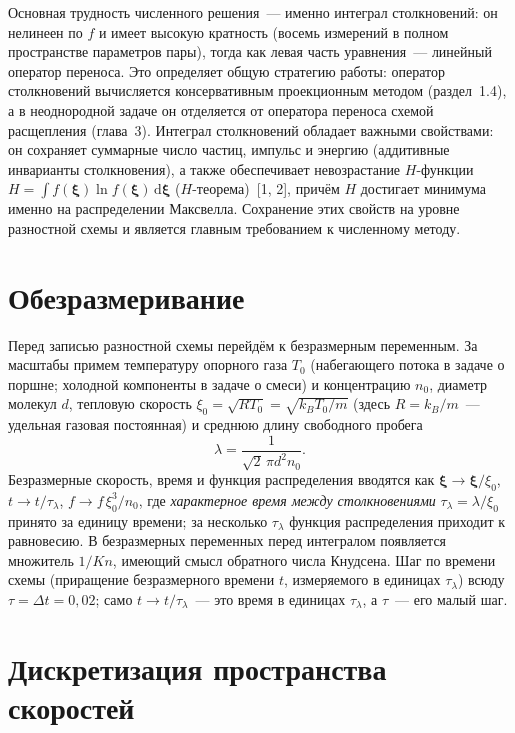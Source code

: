 \documentclass[14pt,a4paper]{extreport}
\numberwithin{equation}{chapter}
\numberwithin{figure}{chapter}
\numberwithin{table}{chapter}
\newcommand{\xv}{\boldsymbol{\xi}}
\newcommand{\dd}{\,\mathrm{d}}
\begin{document}
Основная трудность численного решения~--- именно интеграл столкновений: он нелинеен по $f$ и имеет высокую кратность
(восемь измерений в полном пространстве параметров пары), тогда как левая часть уравнения~--- линейный оператор
переноса.
Это определяет общую стратегию работы: оператор столкновений вычисляется консервативным проекционным методом
(раздел~1.4), а в неоднородной задаче он отделяется от оператора переноса схемой расщепления (глава~3).
Интеграл столкновений обладает важными свойствами: он сохраняет суммарные число частиц, импульс и энергию (аддитивные
инварианты столкновения), а также обеспечивает невозрастание $H$-функции $H = \int f(\xv) \ln f(\xv) \dd\xv$
($H$-теорема)~[1, 2], причём $H$ достигает минимума именно на распределении Максвелла.
Сохранение этих свойств на уровне разностной схемы и является главным требованием к численному методу.

\section{Обезразмеривание}

Перед записью разностной схемы перейдём к безразмерным переменным.
За масштабы примем температуру опорного газа $T_0$ (набегающего потока в задаче о поршне; холодной компоненты в задаче о
смеси) и концентрацию $n_0$, диаметр молекул $d$, тепловую скорость $\xi_0=\sqrt{RT_0}=\sqrt{k_B T_0/m}$ (здесь
$R=k_B/m$~--- удельная газовая постоянная) и среднюю длину свободного пробега
\begin{equation}
  \lambda=\frac{1}{\sqrt{2}\,\pi d^2 n_0}.
\end{equation}
Безразмерные скорость, время и функция распределения вводятся как $\xv\to\xv/\xi_0$, $t\to t/\tau_\lambda$, $f\to
f\,\xi_0^3/n_0$, где \emph{характерное время между столкновениями} $\tau_\lambda=\lambda/\xi_0$ принято за единицу
времени; за несколько $\tau_\lambda$ функция распределения приходит к равновесию.
В безразмерных переменных перед интегралом появляется множитель $1/Kn$, имеющий смысл обратного числа Кнудсена.
Шаг по времени схемы (приращение безразмерного времени $t$, измеряемого в единицах $\tau_\lambda$) всюду $\tau=\Delta
t=0{,}02$; само $t\to t/\tau_\lambda$~--- это время в единицах $\tau_\lambda$, а $\tau$~--- его малый шаг.

\section{Дискретизация пространства скоростей}
\end{document}
